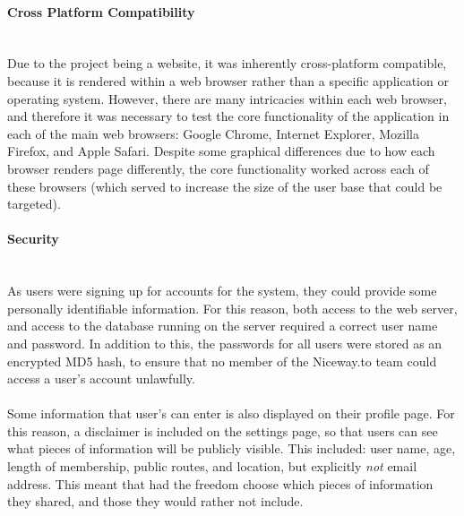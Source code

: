 \paragraph{Cross Platform Compatibility}\ \\
Due to the project being a website, it was inherently cross-platform compatible, because it is rendered within a web browser rather than a specific application or operating system. However, there are many intricacies within each web browser, and therefore it was necessary to test the core functionality of the application in each of the main web browsers: Google Chrome, Internet Explorer, Mozilla Firefox, and Apple Safari. Despite some graphical differences due to how each browser renders page differently, the core functionality worked across each of these browsers (which served to increase the size of the user base that could be targeted).

\paragraph{Security}\ \\
As users were signing up for accounts for the system, they could provide some personally identifiable information. For this reason, both access to the web server, and access to the database running on the server required a correct user name and password. In addition to this, the passwords for all users were stored as an encrypted MD5 hash, to ensure that no member of the Niceway.to team could access a user's account unlawfully. \ \\
\ \\
Some information that user's can enter is also displayed on their profile page. For this reason, a disclaimer is included on the settings page, so that users can see what pieces of information will be publicly visible. This included: user name, age, length of membership, public routes, and location, but explicitly \textit{not} email address. This meant that had the freedom choose which pieces of information they shared, and those they would rather not include.

